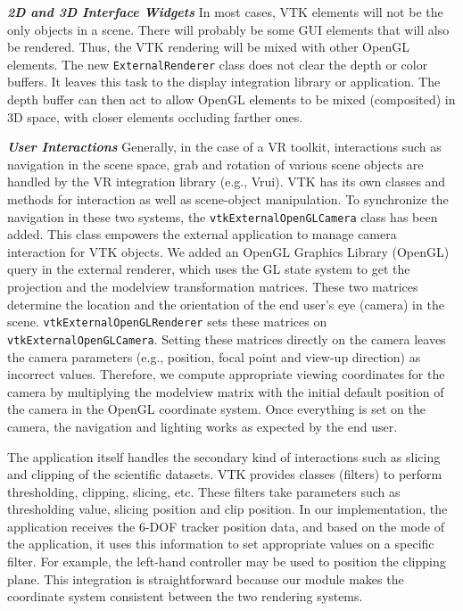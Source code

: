 \textbf{\textit{2D and 3D Interface Widgets}} In most cases, VTK elements will not be the only objects in a scene.
There will probably be some GUI elements that will also be rendered.
Thus, the VTK rendering will be mixed with other OpenGL elements.
The new \texttt{ExternalRenderer} class does not clear the depth or color buffers. It leaves this task to the display integration library or application.
The depth buffer can then act to allow OpenGL elements to be mixed (composited)
in 3D space, with closer elements occluding farther ones.

\textbf{\textit{User Interactions}} Generally, in the case of a VR toolkit, interactions such as navigation in the scene space, grab and rotation of various scene objects are handled by the VR integration library (e.g., Vrui).
VTK has its own classes and methods for interaction as well as scene-object manipulation.
To synchronize the navigation in these two systems, the \texttt{vtkExternalOpenGLCamera} class has been added.
This class empowers the external application to manage camera interaction for VTK objects.
We added an OpenGL Graphics Library (OpenGL) query in the external renderer, which uses the GL state system to get the projection and the modelview transformation matrices.
These two matrices determine the location and the orientation of the end user's eye
(camera) in the scene.
\texttt{vtkExternalOpenGLRenderer} sets these matrices on \texttt{vtkExternalOpenGLCamera}.
Setting these matrices directly on the camera leaves the camera parameters (e.g., position, focal point and view-up direction) as incorrect values. Therefore, we compute appropriate viewing coordinates for the camera by multiplying the modelview matrix with the initial default position of the camera in the OpenGL coordinate system. 
Once everything is set on the camera, the navigation and lighting works as expected by the end user.

The application itself handles the secondary kind of interactions such as slicing and clipping of the scientific datasets.
VTK provides classes (filters) to perform thresholding, clipping, slicing, etc.
These filters take parameters such as thresholding value, slicing position and clip position. 
In our implementation, the application receives the 6-DOF tracker position data, and based on the mode of the application, it uses this information to set appropriate values on a specific filter.
For example, the left-hand controller may be used to position the clipping plane.
This integration is straightforward because our module makes the coordinate system consistent between the two rendering systems.

